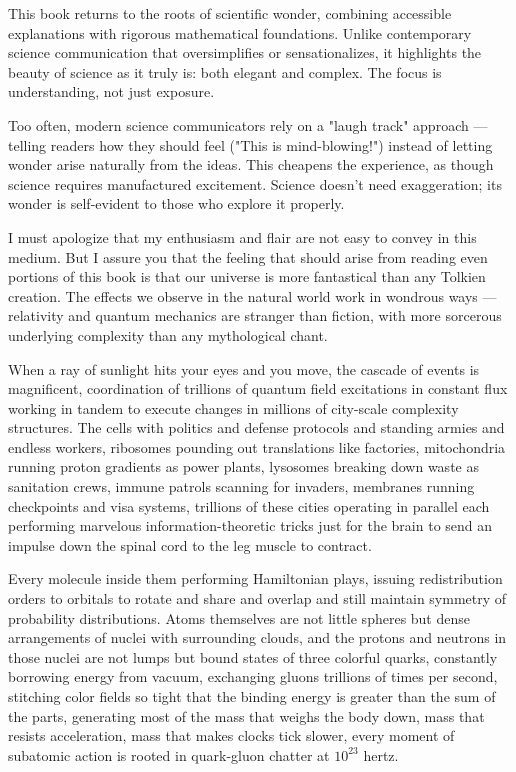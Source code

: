 This book returns to the roots of scientific wonder, combining accessible explanations with rigorous mathematical foundations. Unlike contemporary science communication that oversimplifies or sensationalizes, it highlights the beauty of science as it truly is: both elegant and complex. The focus is understanding, not just exposure.

Too often, modern science communicators rely on a "laugh track" approach — telling readers how they should feel ("This is mind-blowing!") instead of letting wonder arise naturally from the ideas. This cheapens the experience, as though science requires manufactured excitement. Science doesn't need exaggeration; its wonder is self-evident to those who explore it properly.

I must apologize that my enthusiasm and flair are not easy to convey in this medium. But I assure you that the feeling that should arise from reading even portions of this book is that our universe is more fantastical than any Tolkien creation. The effects we observe in the natural world work in wondrous ways — relativity and quantum mechanics are stranger than fiction, with more sorcerous underlying complexity than any mythological chant.

When a ray of sunlight hits your eyes and you move, the cascade of events is magnificent, coordination of trillions of quantum field excitations in constant flux working in tandem to execute changes in millions of city-scale complexity structures. The cells with politics and defense protocols and standing armies and endless workers, ribosomes pounding out translations like factories, mitochondria running proton gradients as power plants, lysosomes breaking down waste as sanitation crews, immune patrols scanning for invaders, membranes running checkpoints and visa systems, trillions of these cities operating in parallel each performing marvelous information-theoretic tricks just for the brain to send an impulse down the spinal cord to the leg muscle to contract.

Every molecule inside them performing Hamiltonian plays, issuing redistribution orders to orbitals to rotate and share and overlap and still maintain symmetry of probability distributions. Atoms themselves are not little spheres but dense arrangements of nuclei with surrounding clouds, and the protons and neutrons in those nuclei are not lumps but bound states of three colorful quarks, constantly borrowing energy from vacuum, exchanging gluons trillions of times per second, stitching color fields so tight that the binding energy is greater than the sum of the parts, generating most of the mass that weighs the body down, mass that resists acceleration, mass that makes clocks tick slower, every moment of subatomic action is rooted in quark-gluon chatter at $10^{23}$ hertz.

